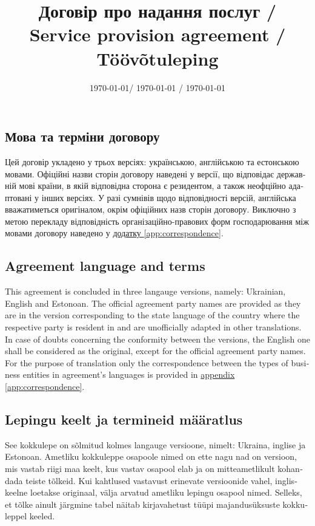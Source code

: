\documentclass[a4paper]{article}
\newcommand\freetext[3]{\begin{ukrainian}#1\end{ukrainian}\switchcolumn\begin{english}#2\end{english}\switchcolumn\begin{estonian}#3\end{estonian}\switchcolumn}
\newcommand\clause[6]{\freetext{\section{#1}#4}{\section{#2}#5}{\section{#3}#6}}
\newcommand\smartref[2]{\hyperref[#1]{#2 \ref{#1}}}
\begin{document}
  \begin{Form}
    \title{Договір про надання послуг / Service provision agreement / Töövõtuleping \TextField[name=contractno]{}}
    \date{\today / \textenglish{\today} / \textestonian{\today}}
    \maketitle

    \begin{paracol}{3}
      \clause
        {Мова та терміни договору}
        {Agreement language and terms}
        {Lepingu keelt ja termineid määratlus}
        {Цей договір укладено у трьох версіях: українською, англійською та естонською мовами. Офіційні назви сторін договору наведені у версії, що відповідає державній мові країни, в якій відповідна сторона є резидентом, а також неофційно адаптовані у інших версіях. У разі сумнівів щодо відповідності версій, англійська вважатиметься оригіналом, окрім офіційних назв сторін договору. Виключно з метою перекладу відповідність ор\-га\-ні\-за\-цій\-но-правових форм господарювання між мовами договору наведено у \smartref{app:correspondence}{додатку}.}
        {This agreement is concluded in three langauge versions, namely: Ukrainian, English and Estonoan. The official agreement party names are provided as they are in the version corresponding to the state language of the country where the respective party is resident in and are unofficially adapted in other translations. In case of doubts concerning the conformity between the versions, the English one shall be considered as the original, except for the official agreement party names. For the purpose of translation only the correspondence between the types of business entities in agreement's languages is provided in \smartref{app:correspondence}{appendix}.}
        {See kokkulepe on sõlmitud kolmes langauge versioone, nimelt: Ukraina, inglise ja Estonoan. Ametliku kokkuleppe osapoole nimed on ette nagu nad on versioon, mis vastab riigi maa keelt, kus vastav osapool elab ja on mitteametlikult kohandada teiste tõlkeid. Kui kahtlused vastavust erinevate versioonide vahel, ingliskeelne loetakse originaal, välja arvatud ametliku lepingu osapool nimed. Selleks, et tõlke ainult järgmine tabel näitab kirjavahetust tüüpi majandusüksuste kokkuleppel keeled.}
    \end{paracol}
  \end{Form}
  \appendix
  
\end{document}

